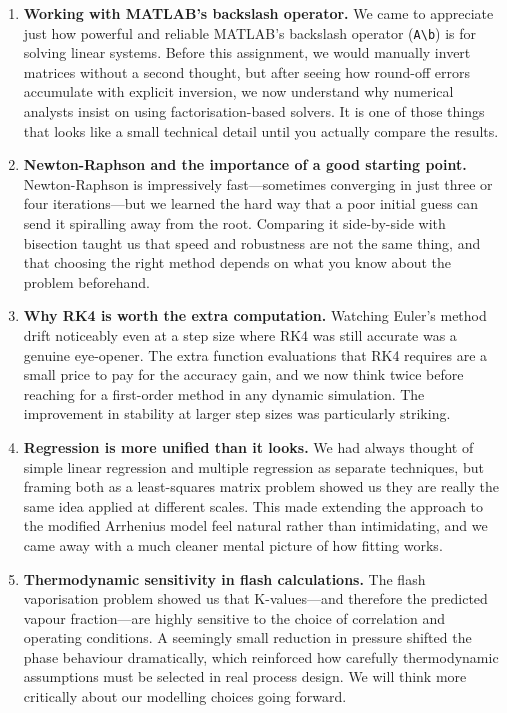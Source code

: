 \documentclass[12pt,a4paper]{article}
\begin{document}
\begin{enumerate}

  \item \textbf{Working with MATLAB's backslash operator.}
  We came to appreciate just how powerful and reliable MATLAB's backslash operator
  (\texttt{A\textbackslash b}) is for solving linear systems. Before this assignment, we would
  manually invert matrices without a second thought, but after seeing how round-off errors
  accumulate with explicit inversion, we now understand why numerical analysts insist on using
  factorisation-based solvers. It is one of those things that looks like a small technical detail
  until you actually compare the results.

  \item \textbf{Newton-Raphson and the importance of a good starting point.}
  Newton-Raphson is impressively fast---sometimes converging in just three or four iterations---but
  we learned the hard way that a poor initial guess can send it spiralling away from the root.
  Comparing it side-by-side with bisection taught us that speed and robustness are not the same
  thing, and that choosing the right method depends on what you know about the problem beforehand.

  \item \textbf{Why RK4 is worth the extra computation.}
  Watching Euler's method drift noticeably even at a step size where RK4 was still accurate was a
  genuine eye-opener. The extra function evaluations that RK4 requires are a small price to pay for
  the accuracy gain, and we now think twice before reaching for a first-order method in any dynamic
  simulation. The improvement in stability at larger step sizes was particularly striking.

  \item \textbf{Regression is more unified than it looks.}
  We had always thought of simple linear regression and multiple regression as separate techniques,
  but framing both as a least-squares matrix problem showed us they are really the same idea applied
  at different scales. This made extending the approach to the modified Arrhenius model feel natural
  rather than intimidating, and we came away with a much cleaner mental picture of how fitting works.

  \item \textbf{Thermodynamic sensitivity in flash calculations.}
  The flash vaporisation problem showed us that K-values---and therefore the predicted vapour
  fraction---are highly sensitive to the choice of correlation and operating conditions. A seemingly
  small reduction in pressure shifted the phase behaviour dramatically, which reinforced how
  carefully thermodynamic assumptions must be selected in real process design. We will think more
  critically about our modelling choices going forward.


\end{enumerate}
\end{document}
